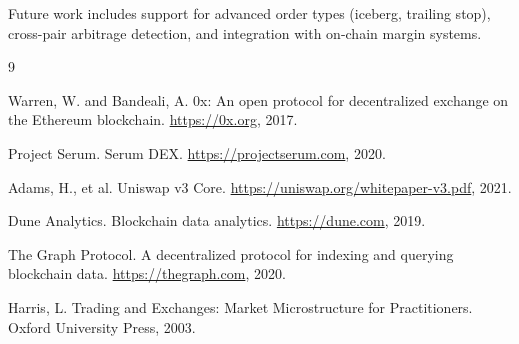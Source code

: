 \documentclass[11pt,twocolumn]{article}
\begin{document}
Future work includes support for advanced order types (iceberg, trailing stop), cross-pair arbitrage detection, and integration with on-chain margin systems.


\begin{thebibliography}{9}

Warren, W. and Bandeali, A. 0x: An open protocol for decentralized exchange on the Ethereum blockchain. \url{https://0x.org}, 2017.

Project Serum. Serum DEX. \url{https://projectserum.com}, 2020.

Adams, H., et al. Uniswap v3 Core. \url{https://uniswap.org/whitepaper-v3.pdf}, 2021.

Dune Analytics. Blockchain data analytics. \url{https://dune.com}, 2019.

The Graph Protocol. A decentralized protocol for indexing and querying blockchain data. \url{https://thegraph.com}, 2020.

Harris, L. Trading and Exchanges: Market Microstructure for Practitioners. Oxford University Press, 2003.

\end{thebibliography}
\end{document}
